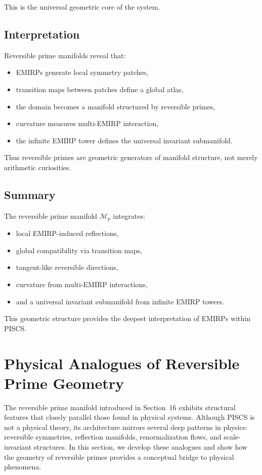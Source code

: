 \documentclass[11pt]{article}
\theoremstyle{definition}
\theoremstyle{plain}
\theoremstyle{remark}
\begin{document}
This is the universal geometric core of the system.

\subsection{Interpretation}

Reversible prime manifolds reveal that:

\begin{itemize}
    \item EMIRPs generate local symmetry patches,
    \item transition maps between patches define a global atlas,
    \item the domain becomes a manifold structured by reversible primes,
    \item curvature measures multi-EMIRP interaction,
    \item the infinite EMIRP tower defines the universal invariant
    submanifold.
\end{itemize}

Thus reversible primes are geometric generators of manifold structure,
not merely arithmetic curiosities.

\subsection{Summary}

The reversible prime manifold $\mathcal{M}_p$ integrates:

\begin{itemize}
    \item local EMIRP-induced reflections,
    \item global compatibility via transition maps,
    \item tangent-like reversible directions,
    \item curvature from multi-EMIRP interactions,
    \item and a universal invariant submanifold from infinite EMIRP
    towers.
\end{itemize}

This geometric structure provides the deepest interpretation of EMIRPs
within PISCS.

\section{Physical Analogues of Reversible Prime Geometry}

The reversible prime manifold introduced in Section~16 exhibits
structural features that closely parallel those found in physical
systems. Although PISCS is not a physical theory, its architecture
mirrors several deep patterns in physics: reversible symmetries,
reflection manifolds, renormalization flows, and scale-invariant
structures. In this section, we develop these analogues and show how the
geometry of reversible primes provides a conceptual bridge to physical
phenomena.
\end{document}
